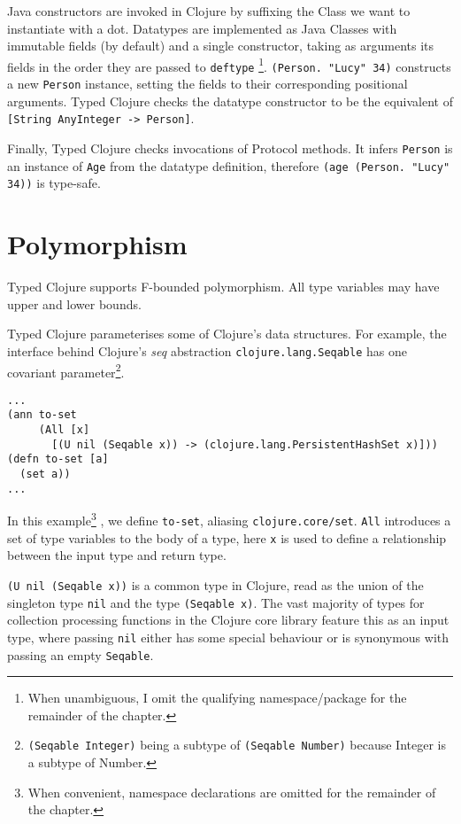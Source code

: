 \documentclass{cshonours}
\begin{document}
Java constructors are invoked in Clojure by suffixing the Class we want to instantiate with a dot.
Datatypes are implemented as Java Classes with immutable fields (by default) and a single constructor, taking as arguments its fields 
in the order they are passed to \lstinline|deftype|
\footnote{When unambiguous, I omit the qualifying namespace/package for the remainder of the chapter.}.
\lstinline|(Person. "Lucy" 34)| constructs a new \lstinline|Person|
instance, setting the fields to their corresponding positional arguments.
Typed Clojure checks the datatype constructor to be the equivalent of 
\lstinline|[String AnyInteger -> Person]|.

Finally, Typed Clojure checks invocations of Protocol methods. It infers \lstinline|Person|
is an instance of \lstinline|Age| from the datatype definition, therefore \lstinline|(age (Person. "Lucy" 34))| is type-safe.

\section{Polymorphism}

Typed Clojure supports F-bounded polymorphism. All type variables may have
upper and lower bounds.

Typed Clojure parameterises some of Clojure's data structures. For example,
the interface behind Clojure's \emph{seq} abstraction \lstinline|clojure.lang.Seqable| has one 
covariant parameter\footnote{\lstinline|(Seqable Integer)| being a subtype of \lstinline|(Seqable Number)|
because Integer is a subtype of Number.}.

\begin{lstlisting}
...
(ann to-set 
     (All [x]
       [(U nil (Seqable x)) -> (clojure.lang.PersistentHashSet x)]))
(defn to-set [a]
  (set a))
...
\end{lstlisting}

In this example\footnote{When convenient, namespace declarations are omitted for the remainder of the chapter.}
, we define \lstinline|to-set|, aliasing \lstinline|clojure.core/set|.
\lstinline|All| introduces a set of type variables to the body of a type,
here \lstinline|x| is used to define a relationship between the input type and return type.

\lstinline|(U nil (Seqable x))| is a common type in Clojure, read as the union
of the singleton type \lstinline|nil| and the type \lstinline|(Seqable x)|.
The vast majority of types for collection processing functions in the Clojure core library feature
this as an input type, where passing \lstinline|nil| either has some special behaviour 
or is synonymous with passing an empty \lstinline|Seqable|.
\end{document}
